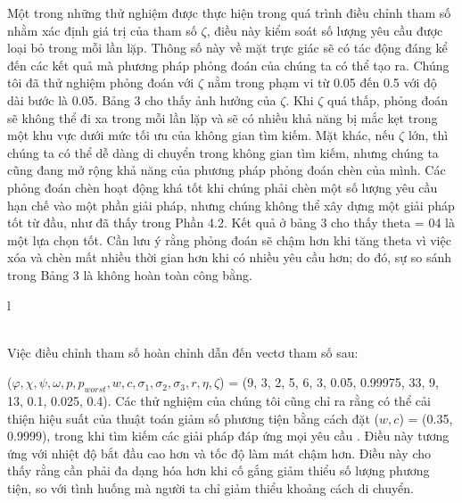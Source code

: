 Một trong những thử nghiệm được thực hiện trong quá trình điều chỉnh tham số nhằm xác định giá trị của tham số $\zeta$, điều này kiểm soát số lượng yêu cầu được loại bỏ trong mỗi lần lặp. Thông số này về mặt trực giác sẽ có tác động đáng kể đến các kết quả mà phương pháp phỏng đoán của chúng ta có thể tạo ra. Chúng tôi đã thử nghiệm phỏng đoán với $\zeta$ nằm trong phạm vi từ 0.05 đến 0.5 với độ dài bước là 0.05. Bảng 3 cho thấy ảnh hưởng của $\zeta$.  Khi $\zeta$ quá thấp, phỏng đoán sẽ không thể đi xa trong mỗi lần lặp và sẽ có nhiều khả năng bị mắc kẹt trong một khu vực dưới mức tối ưu của không gian tìm kiếm. Mặt khác, nếu $\zeta$ lớn, thì chúng ta có thể dễ dàng di chuyển trong không gian tìm kiếm, nhưng chúng ta cũng đang mở rộng khả năng của phương pháp phỏng đoán chèn của mình. Các phỏng đoán chèn hoạt động khá tốt khi chúng phải chèn một số lượng yêu cầu hạn chế vào một phần giải pháp, nhưng chúng không thể xây dựng một giải pháp tốt từ đầu, như đã thấy trong Phần 4.2. Kết quả ở bảng 3 cho thấy theta = 04 là một lựa chọn tốt. Cần lưu ý rằng phỏng đoán sẽ chậm hơn khi tăng theta vì việc xóa và chèn mất nhiều thời gian hơn khi có nhiều yêu cầu hơn; do đó, sự so sánh trong Bảng 3 là không hoàn toàn công bằng.


\begin{longtable}[c]{l}
	 \\
    \\ [1ex]
    \caption*[]{ \textit{Ghi chú: Hàng đầu tiên hiển thị Các giá trị Của tham số $\zeta$ đã được kiểm tra và hàng thứ hai hiển thị khoảng cáCh giữa giải pháp trung bình thu được và giải pháp tốt nhất được tạo ra trong thử nghiệm.}}   
\end{longtable}

Việc điều chỉnh tham số hoàn chỉnh dẫn đến vectơ tham số sau:

($\varphi, \chi, \psi, \omega, p,  p_{worst}, w, c, \sigma_1, \sigma_2, \sigma_3, r, \eta, \zeta$) = (9, 3, 2, 5, 6, 3, 0.05, 0.99975, 33, 9, 13, 0.1, 0.025, 0.4). Các thử nghiệm của chúng tôi cũng chỉ ra rằng có thể cải thiện hiệu suất của thuật toán giảm số phương tiện bằng cách đặt ($w,c$)  = (0.35, 0.9999), trong khi tìm kiếm các giải pháp đáp ứng mọi yêu cầu . Điều này tương ứng với nhiệt độ bắt đầu cao hơn và tốc độ làm mát chậm hơn. Điều này cho thấy rằng cần phải đa dạng hóa hơn khi cố gắng giảm thiểu số lượng phương tiện, so với tình huống mà người ta chỉ giảm thiểu khoảng cách di chuyển.

